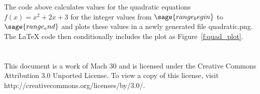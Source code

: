 \documentclass{article}
\begin{document}
The code above calculates values for the quadratic equations $f(x) = x^2 +2x + 3$ for the integer values from $\sage{range_begin}$ to $\sage{range_end}$ and plots these values in a newly generated file quadratic.png.  The LaTeX code then conditionally includes the plot as Figure~\ref{f:quad_plot}.


\section*{}
This document is a work of Mach 30 and is licensed under the Creative Commons Attribution 3.0 Unported License. To view a copy of this license, visit http://creativecommons.org/licenses/by/3.0/.
\end{document}
